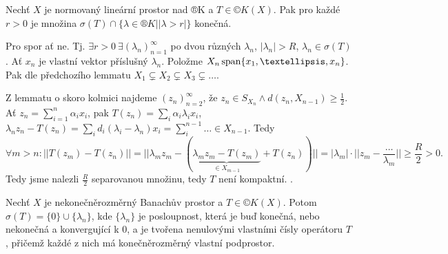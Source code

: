 \documentclass[12pt]{article}					%
\begin{document}
\begin{veta}
	Nechť $X$ je normovaný lineární prostor nad ®K a $T \in ©K(X)$. Pak pro každé $r > 0$ je množina $\sigma(T) \cap \{\lambda \in ®K | |\lambda > r|\}$ konečná.

	\begin{dukazin}
		Pro spor ať ne. Tj. $\exists r > 0\ \exists (\lambda_n)_{n=1}^∞$ po dvou různých $\lambda_n$, $|\lambda_n| > R$, $\lambda_n \in \sigma(T)$. Ať $x_n$ je vlastní vektor příslušný $\lambda_n$. Položme $X_n \spn\{x_1, …, x_n\}$. Pak dle předchozího lemmatu $X_1 \subsetneq X_2 \subsetneq X_3 \subsetneq …$.

		Z lemmatu o skoro kolmici najdeme $(z_n)_{n=2}^∞$, že $z_n \in S_{X_n} \land d(z_n, X_{n-1}) ≥ \frac{1}{2}$. Ať $z_n = \sum_{i=1}^n \alpha_i x_i$, pak $T(z_n) = \sum_i \alpha_i \lambda_i x_i$, $\lambda_n z_n - T(z_n) = \sum_i d_i(\lambda_i - \lambda_n) x_i = \sum_i^{n-1} … \in X_{n-1}$. Tedy
		$$ \forall m > n: ||T(z_m) - T(z_n)|| = ||\lambda_m z_m - (\underbrace{\lambda_m z_m - T(z_m)}_{\in X_{m - 1}} + T(z_n))|| = |\lambda_m|· ||z_m - \frac{…}{\lambda_m}|| ≥ \frac{R}{2} > 0. $$
		Tedy jsme nalezli $\frac{R}{2}$ separovanou množinu, tedy $T$ není kompaktní. \lightning.
	\end{dukazin}
\end{veta}

\begin{dusledek}
	Nechť $X$ je nekonečněrozměrný Banachův prostor a $T \in ©K(X)$. Potom $\sigma(T) = \{0\} \cup \{\lambda_n\}$, kde $\{\lambda_n\}$ je posloupnost, která je buď konečná, nebo nekonečná a konvergující k 0, a je tvořena nenulovými vlastními čísly operátoru $T$, přičemž každé z nich má konečněrozměrný vlastní podprostor.
\end{dusledek}
\end{document}
